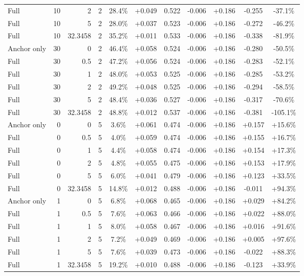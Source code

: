 \begin{table}[htbp]
\begin{tabular}{lrrrccccccc}
Full & 10 & 2 & 2 & 28.4\% & +0.049 & 0.522 & -0.006 & +0.186 & -0.255 & -37.1\% \\
Full & 10 & 5 & 2 & 28.0\% & +0.037 & 0.523 & -0.006 & +0.186 & -0.272 & -46.2\% \\
Full & 10 & 32.3458 & 2 & 35.2\% & +0.011 & 0.533 & -0.006 & +0.186 & -0.338 & -81.9\% \\
Anchor only & 30 & 0 & 2 & 46.4\% & +0.058 & 0.524 & -0.006 & +0.186 & -0.280 & -50.5\% \\
Full & 30 & 0.5 & 2 & 47.2\% & +0.056 & 0.524 & -0.006 & +0.186 & -0.283 & -52.1\% \\
Full & 30 & 1 & 2 & 48.0\% & +0.053 & 0.525 & -0.006 & +0.186 & -0.285 & -53.2\% \\
Full & 30 & 2 & 2 & 49.2\% & +0.048 & 0.525 & -0.006 & +0.186 & -0.294 & -58.5\% \\
Full & 30 & 5 & 2 & 48.4\% & +0.036 & 0.527 & -0.006 & +0.186 & -0.317 & -70.6\% \\
Full & 30 & 32.3458 & 2 & 48.8\% & +0.012 & 0.537 & -0.006 & +0.186 & -0.381 & -105.1\% \\
Anchor only & 0 & 0 & 5 & 3.6\% & +0.061 & 0.474 & -0.006 & +0.186 & +0.157 & +15.6\% \\
Full & 0 & 0.5 & 5 & 4.0\% & +0.059 & 0.474 & -0.006 & +0.186 & +0.155 & +16.7\% \\
Full & 0 & 1 & 5 & 4.4\% & +0.058 & 0.474 & -0.006 & +0.186 & +0.154 & +17.3\% \\
Full & 0 & 2 & 5 & 4.8\% & +0.055 & 0.475 & -0.006 & +0.186 & +0.153 & +17.9\% \\
Full & 0 & 5 & 5 & 6.0\% & +0.041 & 0.479 & -0.006 & +0.186 & +0.123 & +33.5\% \\
Full & 0 & 32.3458 & 5 & 14.8\% & +0.012 & 0.488 & -0.006 & +0.186 & -0.011 & +94.3\% \\
Anchor only & 1 & 0 & 5 & 6.8\% & +0.068 & 0.465 & -0.006 & +0.186 & +0.029 & +84.2\% \\
Full & 1 & 0.5 & 5 & 7.6\% & +0.063 & 0.466 & -0.006 & +0.186 & +0.022 & +88.0\% \\
Full & 1 & 1 & 5 & 8.0\% & +0.058 & 0.467 & -0.006 & +0.186 & +0.016 & +91.6\% \\
Full & 1 & 2 & 5 & 7.2\% & +0.049 & 0.469 & -0.006 & +0.186 & +0.005 & +97.6\% \\
Full & 1 & 5 & 5 & 7.6\% & +0.039 & 0.473 & -0.006 & +0.186 & -0.022 & +88.3\% \\
Full & 1 & 32.3458 & 5 & 19.2\% & +0.010 & 0.488 & -0.006 & +0.186 & -0.123 & +33.9\% \\

\end{tabular}
\end{table}
